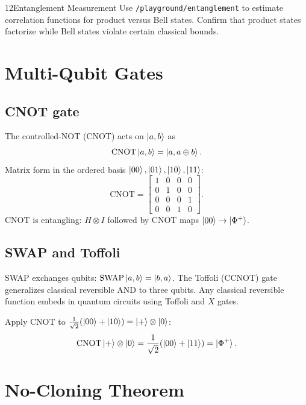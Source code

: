 \begin{labbox}{12}{Entanglement Measurement}
Use \texttt{/playground/entanglement} to estimate correlation functions for product versus Bell states. Confirm that product states factorize while Bell states violate certain classical bounds.
\end{labbox}

\section{Multi-Qubit Gates}
\label{sec:multi-gates}

\subsection{CNOT gate}

The controlled-NOT (CNOT) acts on $\ket{a,b}$ as
\begin{equation}
\mathrm{CNOT}\ket{a,b}=\ket{a,a\oplus b}.
\label{eq:cnot}
\end{equation}
Matrix form in the ordered basis $\ket{00},\ket{01},\ket{10},\ket{11}$:
\begin{equation}
\mathrm{CNOT}=\begin{bmatrix}
1&0&0&0\\0&1&0&0\\0&0&0&1\\0&0&1&0
\end{bmatrix}.
\label{eq:cnot-matrix}
\end{equation}
CNOT is entangling: $H\otimes I$ followed by CNOT maps $\ket{00}\to\ket{\Phi^+}$.

\subsection{SWAP and Toffoli}

SWAP exchanges qubits: $\mathrm{SWAP}\ket{a,b}=\ket{b,a}$. The Toffoli (CCNOT) gate generalizes classical reversible AND to three qubits. Any classical reversible function embeds in quantum circuits using Toffoli and $X$ gates.

\begin{example}
Apply CNOT to $\frac{1}{\sqrt{2}}(\ket{00}+\ket{10})=\ket{+}\otimes\ket{0}$:
\[
\mathrm{CNOT}\ket{+}\otimes\ket{0}=\frac{1}{\sqrt{2}}(\ket{00}+\ket{11})=\ket{\Phi^+}.
\]
\end{example}

\section{No-Cloning Theorem}
\label{sec:no-cloning}

